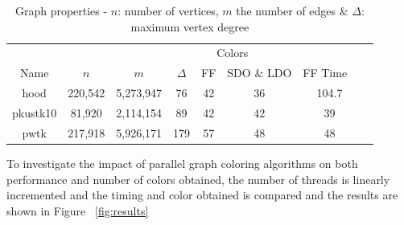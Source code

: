 \documentclass[preprint]{sigplanconf}
\begin{document}
%



\begin{table}[!ht]
\scriptsize
\begin{tabular}{c c c c c c c c }
\hline
  &   &  &  \multicolumn{3}{c}{Colors} &  \\
Name & $n$ & $m$ & $\Delta$ & FF & SDO $\&$ LDO & FF Time \
\\
\hline
hood & 220,542 & 5,273,947 & 76 & 42 & 36 & 104.7\\
pkustk10 & 81,920 & 2,114,154 & 89 & 42 & 42 & 39\\
pwtk & 217,918 & 5,926,171 & 179 & 57 & 48 & 48\\
\end{tabular}
\caption{Graph properties - $n$: number of vertices, $m$ the number of edges $\&$ $\Delta$: maximum vertex degree}
\label{tbl:properties}
\end{table}



To investigate the impact of parallel graph coloring algorithms on  both performance and number of colors obtained, the number of threads is linearly incremented and the timing and color obtained is compared and the results are shown in Figure ~\ref{fig:results}\\
\end{document}
